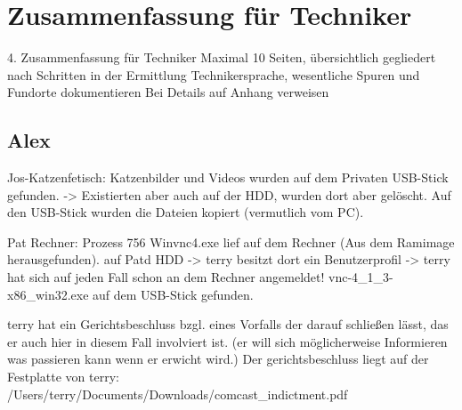 \chapter{Zusammenfassung für Techniker}
\label{sec:tec}


4. Zusammenfassung für Techniker
Maximal 10 Seiten, übersichtlich gegliedert nach Schritten in der Ermittlung
Technikersprache, wesentliche Spuren und Fundorte dokumentieren
Bei Details auf Anhang verweisen

\section{Alex}
Jos-Katzenfetisch:
Katzenbilder und Videos wurden auf dem Privaten USB-Stick gefunden. -> Existierten aber auch auf der HDD, wurden dort aber gelöscht.
Auf den USB-Stick wurden die Dateien kopiert (vermutlich vom PC).

Pat Rechner:
Prozess 756 Winvnc4.exe lief auf dem Rechner (Aus dem Ramimage herausgefunden).
auf Patd HDD -> terry besitzt dort ein Benutzerprofil -> terry hat sich auf jeden Fall schon an dem Rechner angemeldet!
	vnc-4_1_3-x86_win32.exe auf dem USB-Stick gefunden.
	
terry hat ein Gerichtsbeschluss bzgl. eines Vorfalls der darauf schließen lässt, das er auch hier in diesem Fall involviert ist. (er will sich möglicherweise Informieren was passieren kann wenn er erwicht wird.)
Der gerichtsbeschluss liegt auf der Festplatte von terry: /Users/terry/Documents/Downloads/comcast_indictment.pdf